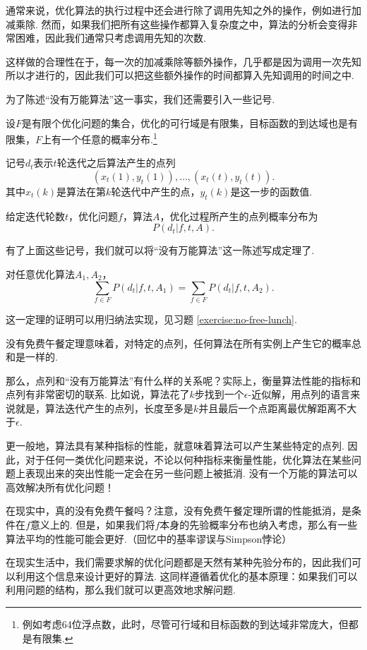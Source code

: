 \begin{remark}
    通常来说，优化算法的执行过程中还会进行除了调用先知之外的操作，例如进行加减乘除. 然而，如果我们把所有这些操作都算入复杂度之中，算法的分析会变得非常困难，因此我们通常只考虑调用先知的次数. 
    
    这样做的合理性在于，每一次的加减乘除等额外操作，几乎都是因为调用一次先知所以才进行的，因此我们可以把这些额外操作的时间都算入先知调用的时间之中. 
\end{remark}

为了陈述“没有万能算法”这一事实，我们还需要引入一些记号. 

设$F$是有限个优化问题的集合，优化的可行域是有限集，目标函数的到达域也是有限集，$F$上有一个任意的概率分布.\footnote{例如考虑64位浮点数，此时，尽管可行域和目标函数的到达域非常庞大，但都是有限集.}

记号$d_t$表示$t$轮迭代之后算法产生的点列
\[(x_t(1),y_t(1)),\dots,(x_t(t),y_t(t)).\]
其中$x_t(k)$是算法在第$k$轮迭代中产生的点，$y_t(k)$是这一步的函数值.

给定迭代轮数$t$，优化问题$f$，算法$A$，优化过程所产生的点列概率分布为
\[P(d_t|f,t,A).\]

有了上面这些记号，我们就可以将“没有万能算法”这一陈述写成定理了. 

\begin{theorem}\label{thm:no-free-lunch}
对任意优化算法$A_1,A_2$，
    \[\sum_{f\in F} P(d_t|f,t,A_1)=\sum_{f\in F} P(d_t|f,t,A_2).\]
\end{theorem}

这一定理的证明可以用归纳法实现，见习题 \ref{exercise:no-free-lunch}.

没有免费午餐定理意味着，对特定的点列，任何算法在所有实例上产生它的概率总和是一样的. 

那么，点列和“没有万能算法”有什么样的关系呢？实际上，衡量算法性能的指标和点列有非常密切的联系. 比如说，算法花了$k$步找到一个$\epsilon$-近似解，用点列的语言来说就是，算法迭代产生的点列，长度至多是$k$并且最后一个点距离最优解距离不大于$\epsilon$. 

更一般地，算法具有某种指标的性能，就意味着算法可以产生某些特定的点列. 因此，对于任何一类优化问题来说，不论以何种指标来衡量性能，优化算法在某些问题上表现出来的突出性能一定会在另一些问题上被抵消. 没有一个万能的算法可以高效解决所有优化问题！

\begin{remark}
    在现实中，真的没有免费午餐吗？注意，没有免费午餐定理所谓的性能抵消，是条件在$f$意义上的. 但是，如果我们将$f$本身的先验概率分布也纳入考虑，那么有一些算法平均的性能可能会更好.（回忆中的基率谬误与Simpson悖论）
    
    在现实生活中，我们需要求解的优化问题都是天然有某种先验分布的，因此我们可以利用这个信息来设计更好的算法. 这同样遵循着优化的基本原理：如果我们可以利用问题的结构，那么我们就可以更高效地求解问题.
\end{remark}

